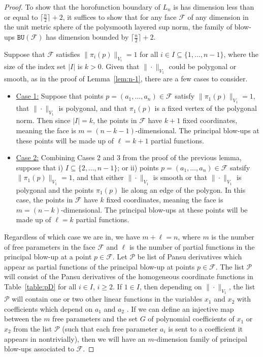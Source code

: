 \documentclass{article}
\theoremstyle{definition}
\newcommand{\BU}{\mathtt{BU}}
\newcommand{\norm}[1]{\|#1\|}
\newcommand{\cF}{{\mathcal F}}
\newcommand{\cP}{{\mathcal P}}
\begin{document}
\begin{proof}



To show that the horofunction boundary of $L_n$ is has dimension less than or equal to $\lceil\frac{ n }{2}\rceil + 2$, it suffices to show that for any face $\cF$ of any dimension in the unit metric sphere of the polysmooth layered sup norm, the family of blow-ups $\BU(\cF)$ has dimension bounded by $\lceil\frac{ n }{2}\rceil + 2$.

Suppose that $\cF$ satisfies $\norm{\pi_i(p)}_{V_i} = 1$ for all $i \in I \subseteq\{1, \ldots, n-1\}$, where the size of the index set $|I|$ is $k>0$. Given that $\norm{\cdot}_{V_1}$ could be polygonal or smooth, as in the proof of Lemma~\ref{lem:n-1}, there are a few cases to consider.

\begin{itemize}
\item \underline{Case 1:} Suppose that points $p= (a_1, \ldots, a_n) \in \cF$ satisfy $\norm{\pi_1(p)}_{V_1} = 1$, that $\norm{\cdot}_{V_1}$ is polygonal, and that $\pi_1(p)$ is a fixed vertex of the polygonal norm. Then since $|I| = k$, the points in $\cF$ have $k+1$ fixed coordinates, meaning the face is $m = (n-k-1)$-dimensional. The principal blow-ups at these points will be made up of $\ell = k+1$ partial functions.

\item \underline{Case 2:} Combining Cases 2 and 3 from the proof of the previous lemma, suppose that i) $I \subseteq \{2, \ldots, n-1\}$; or ii) points $p= (a_1, \ldots, a_n) \in \cF$ satsify $\norm{\pi_1(p)}_{V_1} = 1$, and that either $\norm{\cdot}_{V_1}$ is smooth or that $\norm{\cdot}_{V_1}$ is polygonal and the points $\pi_1(p)$ lie along an edge of the polygon. In this case, the points in $\cF$ have $k$ fixed coordinates, meaning the face is $m = (n-k)$-dimensional. The principal blow-ups at these points will be made up of $\ell = k$ partial functions.
\end{itemize}

Regardless of which case we are in, we have $m + \ell = n$, where $m$ is the number of free parameters in the face $\cF$ and $\ell$ is the number of partial functions in the principal blow-up at a point $p \in \cF$.
Let $\cP$ be list of Pansu derivatives which appear as partial functions of the principal blow-up at points $p \in \cF$. The list $\cP$ will consist of the Pansu derivatives of the homogeneous coordinate functions in Table~\ref{table:pD} for all $i \in I$, $i \geq 2$. If $1 \in I$, then depending on $\norm{\cdot}_{V_1}$, the list $\cP$ will contain one or two other linear functions in the variables $x_1$ and $x_2$ with coefficients which depend on $a_1$ and $a_2$ \cite{schilling-thesis}.
If we can define an injective map between the $m$ free parameters and the set $G$ of polynomial coefficients of $x_1$ or $x_2$ from the list $\cP$ (such that each free parameter $a_i$ is sent to a coefficient it appears in nontrivially), then we will have an $m$-dimension family of principal blow-ups associated to $\cF$.


\end{proof}
\end{document}
